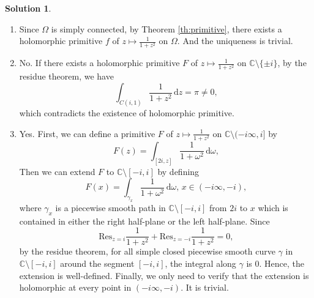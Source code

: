 \documentclass{article}
\theoremstyle{definition}
\newtheorem{solution}{Solution}
\newcommand{\C}{\mathbb{C}}
\newcommand{\dd}{\mathrm{d}}
\newcommand{\res}{\mathrm{Res}}
\begin{document}
\begin{solution}
    \begin{enumerate}
        \item [(a)] Since $\Omega$ is simply connected, by Theorem \ref{th:primitive}, there exists a holomorphic primitive $f$ of $z\mapsto \frac{1}{1+z^2}$ on $\Omega$. And the uniqueness is trivial.
        \item [(b)] No. If there exists a holomorphic primitive $F$ of $z\mapsto \frac{1}{1+z^2}$ on $\C\setminus \{\pm i\}$, by the residue theorem, we have
        \begin{equation*}
            \int_{C(i,1)} \frac{1}{1+z^2}\, \dd z = \pi \neq 0,
        \end{equation*}
        which contradicts the existence of holomorphic primitive.
        \item [(c)] Yes. First, we can define a primitive $F$ of $z\mapsto \frac{1}{1+z^2}$ on $\C\setminus (-i\infty,i]$ by
        \begin{equation*}
            F(z) = \int_{[2i,z]} \frac{1}{1+\omega^2}\, \dd \omega,
        \end{equation*}
        Then we can extend $F$ to $\C\setminus [-i,i]$ by defining 
        \begin{equation*}
            F(x) = \int_{\gamma_x} \frac{1}{1+\omega^2}\, \dd \omega,\, x\in (-i\infty,-i),
        \end{equation*}
        where $\gamma_x$ is a piecewise smooth path in $\C\setminus [-i,i]$ from $2i$ to $x$ which is contained in either the right half-plane or the left half-plane. 
        Since
        \[\res_{z=i} \frac{1}{1+z^2} + \res_{z=-i} \frac{1}{1+z^2} = 0,\]
        by the residue theorem, for all simple closed piecewise smooth curve $\gamma$ in $\C\setminus [-i,i]$ around the segment $[-i,i]$, the integral along $\gamma$ is $0$.
        Hence, the extension is well-defined. Finally, we only need to verify that the extension is holomorphic at every point in $(-i\infty,-i)$. It is trivial.
    \end{enumerate}
\end{solution}
\end{document}
